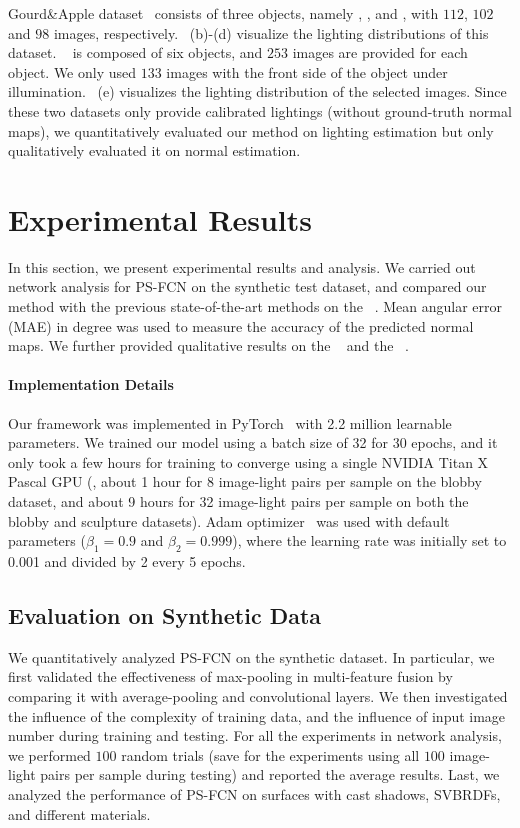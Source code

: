 Gourd\&Apple dataset~\cite{alldrin2008p} consists of three objects, namely , , and , with $112$, $102$ and $98$ images, respectively. 
~(b)-(d) visualize the lighting distributions of this dataset.  
\lightstage~\cite{einarsson2006relighting} is composed of six objects, and $253$ images are provided for each object. We only used $133$ images with the front side of the object under illumination. ~(e) visualizes the lighting distribution of the selected images.
Since these two datasets only provide calibrated lightings (without ground-truth normal maps), we quantitatively evaluated our method on lighting estimation but only qualitatively evaluated it on normal estimation.

\section{Experimental Results}
\label{sec:psfcn_exp}
In this section, we present experimental results and analysis. We carried out network analysis for PS-FCN on the synthetic test dataset, and compared our method with the previous state-of-the-art methods on the \diligent~\cite{shi2019benchmark}. Mean angular error (MAE) in degree was used to measure the accuracy of the predicted normal maps. We further provided qualitative results on the \gourd~\cite{alldrin2008p} and the \lightstage~\cite{einarsson2006relighting}. 

\paragraph{Implementation Details}
Our framework was implemented in PyTorch~\cite{paszke2017pytorch} with 2.2 million learnable parameters. 
We trained our model using a batch size of 32 for 30 epochs, and it only took a few hours for training to converge using a single NVIDIA Titan X Pascal GPU (\eg,  about 1 hour for 8 image-light pairs per sample on the blobby dataset, and about 9 hours for 32 image-light pairs per sample on both the blobby and sculpture datasets).
Adam optimizer~\cite{kingma2014adam} was used with default parameters ($\beta_1=0.9$ and $\beta_2=0.999$), where the learning rate was initially set to 0.001 and divided by 2 every 5 epochs. 

\subsection{Evaluation on Synthetic Data}
We quantitatively analyzed PS-FCN on the synthetic dataset. 
In particular, we first validated the effectiveness of max-pooling in multi-feature fusion by comparing it with average-pooling and convolutional layers.
We then investigated the influence of the complexity of training data, and the influence of input image number during training and testing. 
For all the experiments in network analysis, we performed $100$ random trials (save for the experiments using all $100$ image-light pairs per sample during testing) and reported the average results.
Last, we analyzed the performance of PS-FCN on surfaces with cast shadows, SVBRDFs, and different materials.

